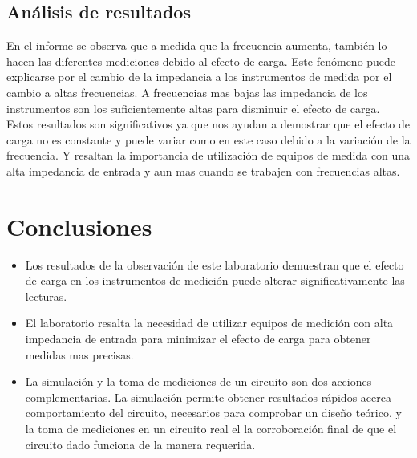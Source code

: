\subsection{Análisis de resultados}

En el informe se observa que a medida que la frecuencia aumenta, también lo hacen las diferentes mediciones debido al efecto de carga. Este fenómeno puede explicarse por el cambio de la impedancia a los instrumentos de medida por el cambio a altas frecuencias. A frecuencias mas bajas las impedancia de los instrumentos son los suficientemente altas para disminuir el efecto de carga.\\
Estos resultados son significativos ya que nos ayudan a demostrar que el efecto de carga no es constante y puede variar como en este caso debido a la variación de la frecuencia. Y resaltan la importancia de utilización de equipos de medida con una alta impedancia de entrada y aun mas cuando se trabajen con frecuencias altas.

\section{Conclusiones}

\begin{itemize}
    \item Los resultados de la observación de este laboratorio demuestran que el efecto de carga en los instrumentos de medición puede alterar significativamente las lecturas.
    \item El laboratorio resalta la necesidad de utilizar equipos de medición con alta impedancia de entrada para minimizar el efecto de carga para obtener medidas mas precisas.
    \item La simulación y la toma de mediciones de un circuito son dos acciones 
    complementarias. La simulación permite obtener resultados rápidos acerca 
    comportamiento del circuito, necesarios para comprobar un diseño teórico, y la 
    toma de mediciones en un circuito real el la corroboración final de que el circuito 
    dado funciona de la manera requerida.
\end{itemize}


